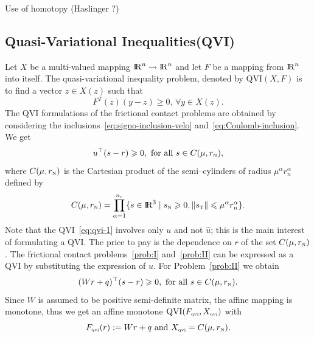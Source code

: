 \begin{ndrva}
  Use of homotopy (Haslinger ?)
\end{ndrva}

\subsection{Quasi-Variational Inequalities(QVI)}

Let $X$ be a multi-valued mapping  $\mathrm{I\!R}^{n} \rightsquigarrow  \mathrm{I\!R}^{n}$ and let  $F$ be a mapping from $\mathrm{I\!R}^n$ into itself. The  quasi-variational inequality  problem, denoted by $\mathrm{QVI}(X,F)$ is to find a vector $z\in X(z)$ such that 
\begin{equation}
 \label{eq:qvi}
 F^{T}(z) (y-z) \ge 0, \, \forall y \in X(z).
\end{equation}
The QVI formulations of the frictional contact problems are obtained by considering the inclusions~\eqref{eq:signo-inclusion-velo} and~\eqref{eq:Coulomb-inclusion}. We get 
\begin{equation}
  \label{eq:qvi-1}
  u^\top (s - r) \geq 0, \text{ for all } s \in C(\mu, r_\n),
\end{equation}
where $C(\mu, r_{\hbox{\tiny{N}}})$ is the Cartesian product of the semi--cylinders of radius $\mu^\alpha r_n^\alpha$ defined by
\begin{equation}
  \label{eq:cylinder}
  C(\mu, r_\n) = \prod_{\alpha =1}^{n_c} \{ s \in \RR^3 \mid  s_\n \geq 0, \|s_\t\| \leq \mu^\alpha r^\alpha_n     \}.
\end{equation}
Note that the QVI~\eqref{eq:qvi-1} involves only $u$ and not $\hat u$; this is the main interest of formulating a QVI. The price to pay is the dependence on $r$ of the set $C(\mu,r_{\hbox{\tiny{N}}})$. The frictional contact problems~\ref{prob:I} and~\ref{prob:II}  can be expressed as a QVI by substituting the expression of $u$. For Problem~\ref{prob:II} we obtain
\begin{equation}
  \label{eq:qvi-IIbis}
   (Wr+q)^\top (s - r) \geq 0, \text{ for all } s \in C(\mu,r_\n).
\end{equation}
Since $W$ is assumed to be positive semi-definite  matrix, the affine mapping is monotone, thus we get an affine monotone $\mathrm{QVI}(F_{{\hbox{\tiny{qvi}}}},X_{{\hbox{\tiny{qvi}}}})$ with
\begin{equation}
  \label{eq:qvi-II}
  F_{\qvitwo}(r) :=  Wr+q \text{ and } X_{\qvitwo} = C(\mu,r_\n) .
\end{equation}


